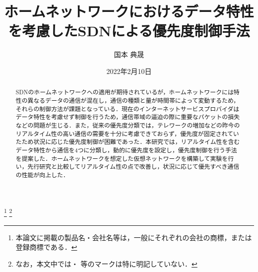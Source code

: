 \documentclass[a4paper,11pt,uplatex]{ujreport}
\title{ホームネットワークにおけるデータ特性を考慮したSDNによる優先度制御手法}  %
\author{国本 典晟}  %
\date{2022年2月10日}  %
\begin{document}
\maketitle
\clearpage

\begin{abstract}

  SDNのホームネットワークへの適用が期待されているが，ホームネットワークには特性の異なるデータの通信が混在し，通信の種類と量が時間帯によって変動するため，それらの制御方法が課題となっている．現在のインターネットサービスプロバイダはデータ特性を考慮せず制御を行うため，通信帯域の逼迫の際に重要なパケットの損失などの問題が生じる．また，従来の優先度分類では，テレワークの増加などの昨今のリアルタイム性の高い通信の需要を十分に考慮できておらず，優先度が固定されていたため状況に応じた優先度制御が困難であった．本研究では，リアルタイム性を含むデータ特性から通信を4つに分類し，動的に優先度を設定し，優先度制御を行う手法を提案した．ホームネットワークを想定した仮想ネットワークを構築して実験を行い，先行研究と比較してリアルタイム性の点で改善し，状況に応じて優先すべき通信の性能が向上した．

\end{abstract}


\footnote[0]{本論文に掲載の製品名・会社名等は，一般にそれぞれの会社の商標，または登録商標である．}
\footnote[0]{なお，本文中では\texttrademark ・ \textregistered 等のマークは特に明記していない．}

\end{document}
